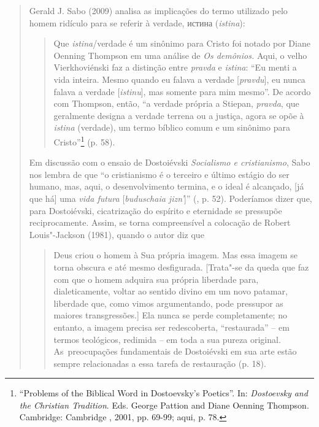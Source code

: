 {\begin{quote}
Gerald J. Sabo (2009) analisa as implicações do termo utilizado pelo
homem ridículo para se referir à verdade,
истина
(\emph{istina}):

\begin{quote}
Que \emph{istina}/verdade é um sinônimo para Cristo foi notado por Diane
Oenning Thompson em uma análise de \emph{Os demônios.} Aqui, o velho
Vierkhoviénski faz a distinção entre \emph{pravda} e \emph{istina}: ``Eu
menti a vida inteira. Mesmo quando eu falava a verdade
[\emph{pravdu}], eu nunca falava a verdade [\emph{istinu}], mas
somente para mim mesmo''. De acordo com Thompson, então, ``a verdade
própria a Stiepan, \emph{pravda}, que geralmente designa a verdade
terrena ou a justiça, agora se opõe à \emph{istina} (verdade), um termo
bíblico comum e um sinônimo para Cristo''\footnote{``Problems of the
  Biblical Word in Dostoevsky's Poetics''. In: \emph{Dostoevsky and the
  Christian Tradition}. Eds. George Pattion and Diane Oenning Thompson.
  Cambridge: Cambridge , 2001, pp. 69-99; aqui, p. 78.} (p. 58).
\end{quote}

Em discussão com o ensaio de Dostoiévski \emph{Socialismo e
cristianismo}, Sabo nos lembra de que ``o cristianismo é o terceiro e
último estágio do ser humano, mas, aqui, o desenvolvimento termina, e o
ideal é alcançado, {[}já que há{]} uma \emph{vida futura}
{[}\emph{buduschaia jizn'}{]}'' (, p. 52). Poderíamos dizer que,
para Dostoiévski, cicatrização do espírito e eternidade se pressupõe
reciprocamente. Assim, se torna compreensível a colocação de Robert
Louis"-Jackson (1981), quando o autor diz que

\begin{quote}
Deus criou o homem à Sua própria imagem. Mas essa imagem se torna
obscura e até mesmo desfigurada. {[}Trata"-se da queda que faz com que o
homem adquira sua própria liberdade para, dialeticamente, voltar ao
sentido divino em um novo patamar, liberdade que, como vimos
argumentando, pode pressupor as maiores transgressões.{]} Ela nunca se
perde completamente; no entanto, a imagem precisa ser redescoberta,
``restaurada'' -- em termos teológicos, redimida -- em toda a sua pureza
original. As~preocupações fundamentais de Dostoiévski em sua arte estão
sempre relacionadas a essa tarefa de restauração (p. 18).
\end{quote}


\end{quote}}
